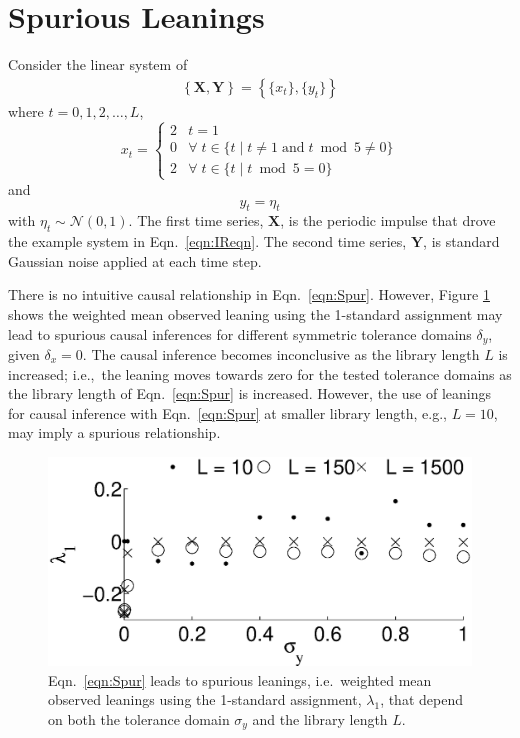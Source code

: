 \documentclass[twocolumn,aps,pre,groupedaddress]{revtex4-1}
\begin{document}
\section{Spurious Leanings}
Consider the linear system of
\begin{eqnarray}
\label{eqn:Spur}
\left\{\mathbf{X},\mathbf{Y}\right\} = \left\{\{x_t\},\{y_t\}\right\}
\end{eqnarray}
where $t=0,1,2,\ldots,L$,
\begin{equation*}
x_t = \left\{
  \begin{array}{lr}
    2 & t = 1\\
    0 & \forall\; t\in\{t\;|\;t\neq 1 \;\mathrm{and}\; t\bmod 5 \neq 0\}\\
    2 & \forall\; t\in\{t\;|\;t\bmod 5 = 0\}
  \end{array}
\right.
\end{equation*}
and
\begin{equation*}
y_t = \eta_t
\end{equation*}
with $\eta_t\sim\mathcal{N}\left(0,1\right)$.  The first time series, $\mathbf{X}$, is the periodic impulse that drove the example system in Eqn.\ \ref{eqn:IReqn}.  The second time series, $\mathbf{Y}$, is standard Gaussian noise applied at each time step.  

There is no intuitive causal relationship in Eqn.\ \ref{eqn:Spur}.  However, Figure \ref{fig:nocause} shows the weighted mean observed leaning using the 1-standard assignment may lead to spurious causal inferences for different symmetric tolerance domains $\delta_y$, given $\delta_x = 0$.  The causal inference becomes inconclusive as the library length $L$ is increased; i.e.,\ the leaning moves towards zero for the tested tolerance domains as the library length of Eqn.\ \ref{eqn:Spur} is increased.  However, the use of leanings for causal inference with Eqn.\ \ref{eqn:Spur} at smaller library length, e.g., $L=10$, may imply a spurious relationship. 
\begin{figure}[ht]
\includegraphics[scale=0.45]{NoCauseplot.eps}
\caption{Eqn.\ \ref{eqn:Spur} leads to spurious leanings, i.e.\ weighted mean observed leanings using the 1-standard assignment, $\lambda_1$, that depend on both the tolerance domain $\sigma_y$ and the library length $L$.}
\label{fig:nocause}
\end{figure}
\end{document}
